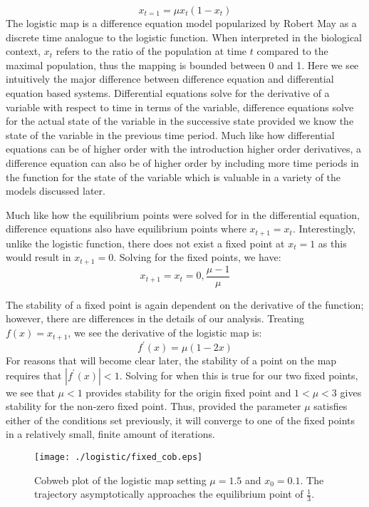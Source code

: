 \begin{equation}
    x_{t=1}=\mu x_t(1-x_t)
\end{equation}
The logistic map is a difference equation model popularized by Robert May as a discrete time analogue to the logistic function\autocite{May1976}. When interpreted in the biological context, $x_t$ refers to the ratio of the population at time $t$ compared to the maximal population, thus the mapping is bounded between 0 and 1. Here we see intuitively the major difference between difference equation and differential equation based systems. Differential equations solve for the derivative of a variable with respect to time in terms of the variable, difference equations solve for the actual state of the variable in the successive state provided we know the state of the variable in the previous time period. Much like how differential equations can be of higher order with the introduction higher order derivatives, a difference equation can also be of higher order by including more time periods in the function for the state of the variable which is valuable in a variety of the models discussed later.

Much like how the equilibrium points were solved for in the differential equation, difference equations also have equilibrium points where $x_{t+1}=x_t$. Interestingly, unlike the logistic function, there does not exist a fixed point at $x_t=1$ as this would result in $x_{t+1}=0$. Solving for the fixed points, we have:
\begin{equation}
    x_{t+1}=x_t=0,\frac{\mu-1}{\mu}
\end{equation}

The stability of a fixed point is again dependent on the derivative of the function; however, there are differences in the details of our analysis. Treating $f(x)=x_{t+1}$, we see the derivative of the logistic map is:
\begin{equation}
    f^\prime(x)=\mu(1-2x)
\end{equation}
For reasons that will become clear later, the stability of a point on the map requires that $|f^\prime(x)|<1$. Solving for when this is true for our two fixed points, we see that $\mu<1$ provides stability for the origin fixed point and $1<\mu<3$ gives stability for the non-zero fixed point. Thus, provided the parameter $\mu$ satisfies either of the conditions set previously, it will converge to one of the fixed points in a relatively small, finite amount of iterations. 

\begin{figure}
    \centering
    \texttt{[image: ./logistic/fixed\_cob.eps]}
    \caption{Cobweb plot of the logistic map setting $\mu=1.5$ and $x_0=0.1$. The trajectory asymptotically approaches the equilibrium point of $\frac{1}{3}$.}
    \label{log_fixed_cob}
\end{figure}


